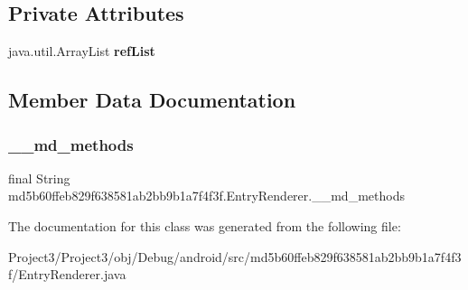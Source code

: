 \subsection*{Private Attributes}
\begin{DoxyCompactItemize}
\item 
\mbox{\label{classmd5b60ffeb829f638581ab2bb9b1a7f4f3f_1_1EntryRenderer_a58f9f17859b75ef1547191607bb86aaa}} 
java.\+util.\+Array\+List {\bfseries ref\+List}
\end{DoxyCompactItemize}


\subsection{Member Data Documentation}
\mbox{\label{classmd5b60ffeb829f638581ab2bb9b1a7f4f3f_1_1EntryRenderer_ad2206e7a8e60b685459381a385bdf9f1}} 
\subsubsection{\texorpdfstring{\+\_\+\+\_\+md\+\_\+methods}{\_\_md\_methods}}
{\footnotesize\ttfamily final String md5b60ffeb829f638581ab2bb9b1a7f4f3f.\+Entry\+Renderer.\+\_\+\+\_\+md\+\_\+methods\hspace{0.3cm}{\ttfamily [static]}}



The documentation for this class was generated from the following file\+:\begin{DoxyCompactItemize}
\item 
Project3/\+Project3/obj/\+Debug/android/src/md5b60ffeb829f638581ab2bb9b1a7f4f3f/Entry\+Renderer.\+java\end{DoxyCompactItemize}
